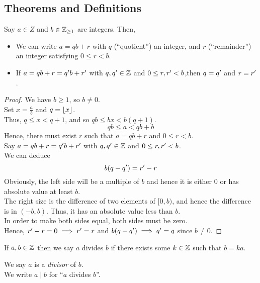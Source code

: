 \documentclass[a4paper]{article}
\begin{document}
\subsection{Theorems and Definitions}
\begin{lemma}
Say $a \in Z$ and $b \in \mathbb{Z}_{\geq 1}$ are integers. Then,
\begin{itemize}
	\item We can write $a = qb + r$ with $q$ (“quotient”) an integer, and $r$ (“remainder”) an integer satisfying $0 \leq r < b$.
	\item If $a = qb+r = q^\prime b + r^\prime$ with $q, q^\prime \in \mathbb{Z}$ and $0 \leq r,r^\prime < b$,then $q = q^\prime$ and $r = r^\prime$.
\end{itemize}
\end{lemma}
\begin{proof}
We have $b \geq 1$, so $b \neq 0$.\\
Set $x = \frac{a}{b}$ and $q = \left\lfloor x \right\rfloor$.\\
Thus, $q \leq x < q + 1$, and so $qb \leq bx < b(q+1)$.
$$qb \leq a < qb + b$$
Hence, there must exist $r$ such that $a = qb + r$ and $0 \leq r < b$.
\vspace{0.2cm}\\
Say $a = qb+r = q^\prime b + r^\prime$ with $q, q^\prime \in \mathbb{Z}$ and $0 \leq r,r^\prime < b$.\\
We can deduce $$b(q - q^\prime) = r^\prime - r$$
Obviously, the left side will be a multiple of $b$ and hence it is either $0$ or has absolute value at least $b$.\\
The right size is the difference of two elements of $[0, b)$, and hence the difference is in $(-b, b)$. Thus, it has an absolute value less than $b$.\\
In order to make both sides equal, both sides must be zero.\\
Hence, $r^\prime - r = 0 \implies r^\prime = r$ and $b(q - q^\prime) \implies q^\prime = q$ since $b \neq 0$.
\end{proof}

\begin{defi}
If $a, b \in \mathbb{Z}$ then we say $a$ divides $b$ if there exists some $k \in \mathbb{Z}$ such that $b = ka$.
\end{defi}
\begin{notation}
We say $a$ is a \emph{divisor} of $b$.\\
We write $a \mid b$ for ``$a$ divides $b$''.
\end{notation}
\end{document}
